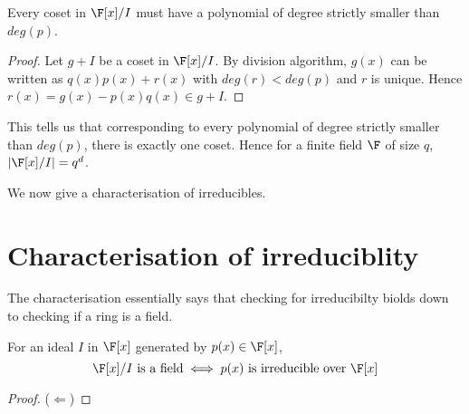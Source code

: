 \begin{observation}
	Every coset in $\F[x]/I$ must have a polynomial of degree strictly
	smaller than $deg(p)$.
\end{observation}
\begin{proof}
	Let $g + I$ be a coset in $\F[x]/I$. By division algorithm, $g(x)$ can
	be written as $q(x)p(x) + r(x)$ with $deg(r) < deg(p)$ and $r$ is
	unique. Hence $r(x) = g(x) - p(x)q(x) \in g +I$.
\end{proof}

This tells us that corresponding to every polynomial of degree strictly
smaller than $deg(p)$, there is exactly one coset. Hence for a finite field
$\F$ of size $q$, $|\F[x]/I| = q^d$. 

We now give a characterisation of irreducibles.
\section{Characterisation of irreduciblity}
The characterisation essentially says that checking for irreducibilty biolds
down to checking if a ring is a field.
\begin{theorem}
	For an ideal $I$ in $\F[x]$ generated by $p(x) \in \F[x]$, 
	\[ \F[x]/I \text{ is a field} \iff p(x) \text{ is irreducible over }
	\F[x] \]
\end{theorem}
\begin{proof}
	($\Longleftarrow$)
\end{proof}
